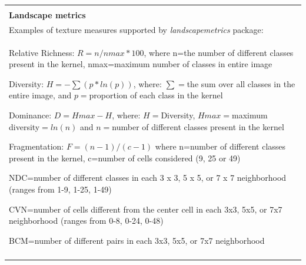 \documentclass[12pt]{article}
\newenvironment{boxed}
{\begin{center}
		\begin{tabular}{|p{0.9\textwidth}|}
			\hline\\
		}
		{ 
			\\\\\hline
		\end{tabular} 
	\end{center}
}
\begin{document}
\begin{boxed}

\textbf{Landscape metrics}

\\

Examples of texture measures supported by \textit{landscapemetrics} package:

\\

Relative Richness: $R=n/nmax*100$, where n=the number of different classes present in the kernel, nmax=maximum number of classes in entire image

Diversity: $H=-\sum(p*ln(p))$, where: $\sum=$the sum over all classes in the entire image, and $p=$proportion of each class in the kernel

Dominance: $D=Hmax-H$, where: $H=$Diversity, $Hmax=$maximum diversity$=ln(n)$ and $n=$number of different classes present in the kernel

Fragmentation: $F=(n-1)/(c-1)$ where n=number of different classes present in the kernel, c=number of cells considered (9, 25 or 49)

NDC=number of different classes in each 3 x 3, 5 x 5, or 7 x 7 neighborhood (ranges from 1-9, 1-25, 1-49)

CVN=number of cells different from the center cell in each 3x3, 5x5, or 7x7 neighborhood (ranges from 0-8, 0-24, 0-48)

BCM=number of different pairs in each 3x3, 5x5, or 7x7 neighborhood


\end{boxed}


\end{document}
